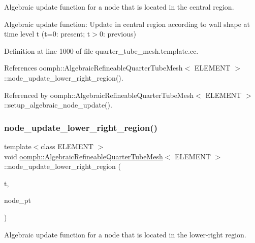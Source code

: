 Algebraic update function for a node that is located in the central region. 

Algebraic update function\+: Update in central region according to wall shape at time level t (t=0\+: present; t$>$0\+: previous) 

Definition at line 1000 of file quarter\+\_\+tube\+\_\+mesh.\+template.\+cc.



References oomph\+::\+Algebraic\+Refineable\+Quarter\+Tube\+Mesh$<$ E\+L\+E\+M\+E\+N\+T $>$\+::node\+\_\+update\+\_\+lower\+\_\+right\+\_\+region().



Referenced by oomph\+::\+Algebraic\+Refineable\+Quarter\+Tube\+Mesh$<$ E\+L\+E\+M\+E\+N\+T $>$\+::setup\+\_\+algebraic\+\_\+node\+\_\+update().

\mbox{\label{classoomph_1_1AlgebraicRefineableQuarterTubeMesh_a52fb1161ebff25b5c638ac35cb541817}} 
\subsubsection{\texorpdfstring{node\+\_\+update\+\_\+lower\+\_\+right\+\_\+region()}{node\_update\_lower\_right\_region()}}
{\footnotesize\ttfamily template$<$class E\+L\+E\+M\+E\+NT $>$ \\
void \hyperlink{classoomph_1_1AlgebraicRefineableQuarterTubeMesh}{oomph\+::\+Algebraic\+Refineable\+Quarter\+Tube\+Mesh}$<$ E\+L\+E\+M\+E\+NT $>$\+::node\+\_\+update\+\_\+lower\+\_\+right\+\_\+region (\begin{DoxyParamCaption}\item[{const unsigned \&}]{t,  }\item[{Algebraic\+Node $\ast$\&}]{node\+\_\+pt }\end{DoxyParamCaption})\hspace{0.3cm}{\ttfamily [private]}}



Algebraic update function for a node that is located in the lower-\/right region. 

